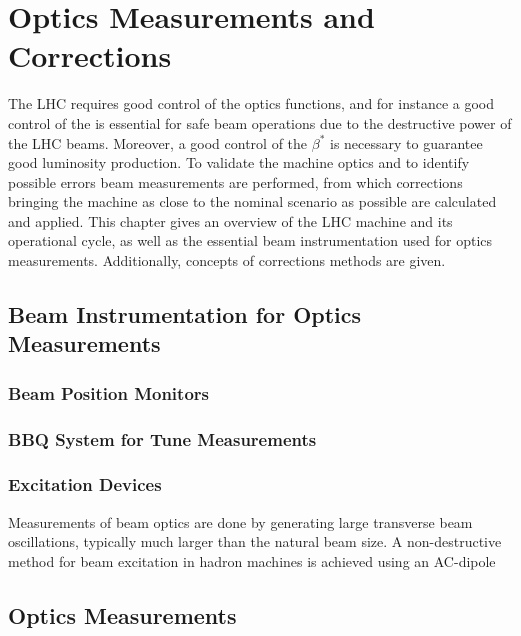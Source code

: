 \section{Optics Measurements and Corrections}
\label{section:optics_measurements_and_corrections}

The LHC requires good control of the optics functions, and for instance a good control of the \betafunctions is essential for safe beam operations due to the destructive power of the LHC beams.
Moreover, a good control of the \(\beta^{\ast}\) is necessary to guarantee good luminosity production.
To validate the machine optics and to identify possible errors beam measurements are performed, from which corrections bringing the machine as close to the nominal scenario as possible are calculated and applied. 
This chapter gives an overview of the LHC machine and its operational cycle, as well as the essential beam instrumentation used for optics measurements.
Additionally, concepts of corrections methods are given.

\subsection{Beam Instrumentation for Optics Measurements}

\subsubsection{Beam Position Monitors}


\subsubsection{BBQ System for Tune Measurements}

\subsubsection{Excitation Devices}


Measurements of beam optics are done by generating large transverse beam oscillations, typically much larger than the natural beam size.
A non-destructive method for beam excitation in hadron machines is achieved using an AC-dipole

\subsection{Optics Measurements}
\label{subsection:optics_measurements}

